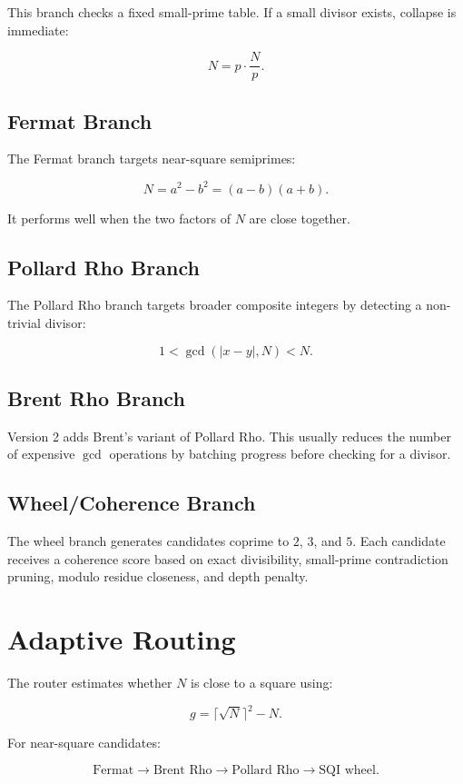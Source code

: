 \documentclass[11pt,a4paper]{article}
\begin{document}
This branch checks a fixed small-prime table. If a small divisor exists, collapse is immediate:

\[
N = p \cdot \frac{N}{p}.
\]

\subsection{Fermat Branch}

The Fermat branch targets near-square semiprimes:

\[
N = a^2 - b^2 = (a-b)(a+b).
\]

It performs well when the two factors of \(N\) are close together.

\subsection{Pollard Rho Branch}

The Pollard Rho branch targets broader composite integers by detecting a non-trivial divisor:

\[
1 < \gcd(|x-y|, N) < N.
\]

\subsection{Brent Rho Branch}

Version 2 adds Brent's variant of Pollard Rho. This usually reduces the number of expensive
\(\gcd\) operations by batching progress before checking for a divisor.

\subsection{Wheel/Coherence Branch}

The wheel branch generates candidates coprime to \(2\), \(3\), and \(5\). Each candidate
receives a coherence score based on exact divisibility, small-prime contradiction pruning,
modulo residue closeness, and depth penalty.

\section{Adaptive Routing}

The router estimates whether \(N\) is close to a square using:

\[
g = \lceil\sqrt{N}\rceil^2 - N.
\]

For near-square candidates:

\[
\text{Fermat}
\rightarrow
\text{Brent Rho}
\rightarrow
\text{Pollard Rho}
\rightarrow
\text{SQI wheel}.
\]
\end{document}
